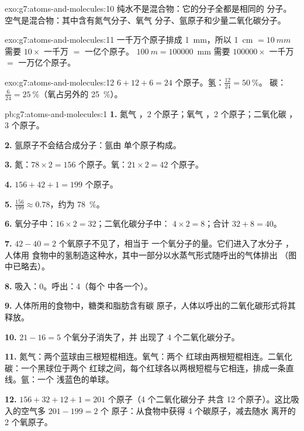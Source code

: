 \begin{solution}{exo:g7:atoms-and-molecules:10}
纯水不是混合物：它的分子全都是相同的 
分子。空气是混合物：其中含有氮气分子、氧气
分子、氩原子和少量二氧化碳分子。
\end{solution}

\begin{solution}{exo:g7:atoms-and-molecules:11}
一千万个原子排成 \qty{1}{mm}，所以 \qty{1}{cm} $= \qty{10}{mm}$
需要 $10 \times$ 一千万 $=$ 一亿个原子。
$\qty{100}{m} = \num{100000}$~mm 需要 $\num{100000}\times$ 一千万
$=$ 一万亿个原子。
\end{solution}

\begin{solution}{exo:g7:atoms-and-molecules:12}
$6 + 12 + 6 = 24$ 个原子。氢：$\frac{12}{24} = \qty{50}{\percent}$。
碳：$\frac{6}{24} = \qty{25}{\percent}$（氧占另外的
\qty{25}{\percent}）。
\end{solution}

\begin{solution}{pb:g7:atoms-and-molecules:1}
\textbf{1.} 氮气 ，2 个原子；氧气 ，2 个原子；二氧化碳
，3 个原子。

\textbf{2.} 氩原子不会结合成分子：氩由
单个原子构成。

\textbf{3.} 氮：$78 \times 2 = 156$ 个原子。氧：$21\times 2 =
42$ 个原子。

\textbf{4.} $156 + 42 + 1 = 199$ 个原子。

\textbf{5.} $\frac{156}{199} \approx 0.78$，约为 \qty{78}{\percent}。

\textbf{6.} 氧分子中：$16\times 2 = 32$；二氧化碳分子中：
$4 \times 2 = 8$；合计 $32 + 8 = 40$。

\textbf{7.} $42 - 40 = 2$ 个氧原子不见了，相当于
一个氧分子的量。它们进入了水分子 ，人体用
食物中的氢制造这种水，其中一部分以水蒸气形式随呼出的气体排出
（图中已略去）。

\textbf{8.} 吸入：0。呼出：4（每个  中各一个）。

\textbf{9.} 人体所用的食物中，糖类和脂肪含有碳
原子，人体以呼出的二氧化碳形式将其释放。

\textbf{10.} $21 - 16 = 5$ 个氧分子消失了，并
出现了 4 个二氧化碳分子。

\textbf{11.} 氮气：两个蓝球由三根短棍相连。氧气：两个
红球由两根短棍相连。二氧化碳：一个黑球位于两个
红球之间，每个红球各以两根短棍与它相连，排成一条直线。氩：一个
浅蓝色的单球。

\textbf{12.} $156 + 32 + 12 + 1 = 201$ 个原子（4 个二氧化碳分子
共含 12 个原子）。这比吸入的空气多 $201 - 199 = 2$ 个
原子：从食物中获得 4 个碳原子，减去随水
离开的 2 个氧原子。
\end{solution}
